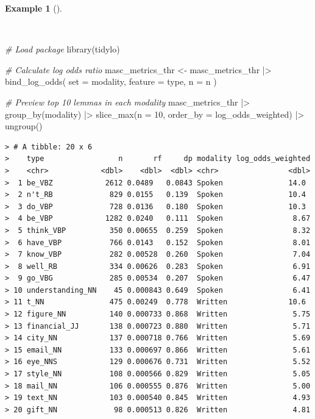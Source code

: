 \documentclass[
  letterpaper,
  DIV=11,
  numbers=noendperiod]{scrreprt}
\newenvironment{Shaded}{\begin{snugshade}}{\end{snugshade}}
\newcommand{\AttributeTok}[1]{\textcolor[rgb]{0.00,0.00,0.00}{#1}}
\newcommand{\CommentTok}[1]{\textcolor[rgb]{0.00,0.00,0.00}{\textit{#1}}}
\newcommand{\DecValTok}[1]{\textcolor[rgb]{0.00,0.00,0.00}{#1}}
\newcommand{\FunctionTok}[1]{\textcolor[rgb]{0.00,0.00,0.00}{#1}}
\newcommand{\NormalTok}[1]{\textcolor[rgb]{0.00,0.00,0.00}{#1}}
\newcommand{\OtherTok}[1]{\textcolor[rgb]{0.00,0.00,0.00}{#1}}
\newcommand{\SpecialCharTok}[1]{\textcolor[rgb]{0.00,0.00,0.00}{#1}}
\theoremstyle{definition}
\newtheorem{example}{Example}[chapter]
\theoremstyle{remark}
\begin{document}
\begin{example}[]\protect\hypertarget{exm-eda-masc-log-odds-weighted}{}\label{exm-eda-masc-log-odds-weighted}

~

\begin{Shaded}
\begin{Highlighting}[]
\CommentTok{\# Load package}
\FunctionTok{library}\NormalTok{(tidylo)}

\CommentTok{\# Calculate log odds ratio}
\NormalTok{masc\_metrics\_thr }\OtherTok{\textless{}{-}}
\NormalTok{  masc\_metrics\_thr }\SpecialCharTok{|\textgreater{}}
  \FunctionTok{bind\_log\_odds}\NormalTok{(}
    \AttributeTok{set =}\NormalTok{ modality,}
    \AttributeTok{feature =}\NormalTok{ type,}
    \AttributeTok{n =}\NormalTok{ n}
\NormalTok{  )}

\CommentTok{\# Preview top 10 lemmas in each modality}
\NormalTok{masc\_metrics\_thr }\SpecialCharTok{|\textgreater{}}
  \FunctionTok{group\_by}\NormalTok{(modality) }\SpecialCharTok{|\textgreater{}}
  \FunctionTok{slice\_max}\NormalTok{(}\AttributeTok{n =} \DecValTok{10}\NormalTok{, }\AttributeTok{order\_by =}\NormalTok{ log\_odds\_weighted) }\SpecialCharTok{|\textgreater{}}
  \FunctionTok{ungroup}\NormalTok{()}
\end{Highlighting}
\end{Shaded}

\begin{verbatim}
> # A tibble: 20 x 6
>    type                 n       rf     dp modality log_odds_weighted
>    <chr>            <dbl>    <dbl>  <dbl> <chr>                <dbl>
>  1 be_VBZ            2612 0.0489   0.0843 Spoken               14.0 
>  2 n't_RB             829 0.0155   0.139  Spoken               10.4 
>  3 do_VBP             728 0.0136   0.180  Spoken               10.3 
>  4 be_VBP            1282 0.0240   0.111  Spoken                8.67
>  5 think_VBP          350 0.00655  0.259  Spoken                8.32
>  6 have_VBP           766 0.0143   0.152  Spoken                8.01
>  7 know_VBP           282 0.00528  0.260  Spoken                7.04
>  8 well_RB            334 0.00626  0.283  Spoken                6.91
>  9 go_VBG             285 0.00534  0.207  Spoken                6.47
> 10 understanding_NN    45 0.000843 0.649  Spoken                6.41
> 11 t_NN               475 0.00249  0.778  Written              10.6 
> 12 figure_NN          140 0.000733 0.868  Written               5.75
> 13 financial_JJ       138 0.000723 0.880  Written               5.71
> 14 city_NN            137 0.000718 0.766  Written               5.69
> 15 email_NN           133 0.000697 0.866  Written               5.61
> 16 eye_NNS            129 0.000676 0.731  Written               5.52
> 17 style_NN           108 0.000566 0.829  Written               5.05
> 18 mail_NN            106 0.000555 0.876  Written               5.00
> 19 text_NN            103 0.000540 0.845  Written               4.93
> 20 gift_NN             98 0.000513 0.826  Written               4.81
\end{verbatim}

\end{example}
\end{document}
